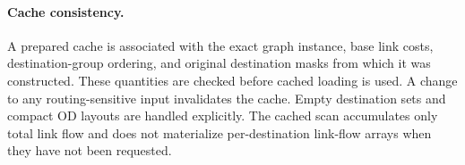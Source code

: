 \paragraph{Cache consistency.}
A prepared cache is associated with the exact graph instance, base link costs,
destination-group ordering, and original destination masks from which it was
constructed. These quantities are checked before cached loading is used. A
change to any routing-sensitive input invalidates the cache. Empty destination
sets and compact OD layouts are handled explicitly. The cached scan accumulates
only total link flow and does not materialize per-destination link-flow arrays
when they have not been requested.

